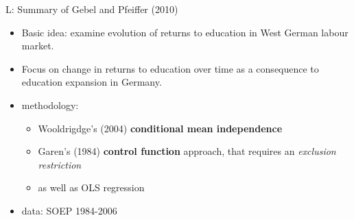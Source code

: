 \documentclass[10pt,ignorenonframetext,]{beamer}
\providecommand{\tightlist}{%
  \setlength{\itemsep}{0pt}\setlength{\parskip}{0pt}}
\begin{document}
\begin{frame}{L: Summary of Gebel and Pfeiffer (2010)}
\protect\hypertarget{l-summary-of-gebel-and-pfeiffer-2010}{}

\begin{itemize}
\item
  Basic idea: examine evolution of returns to education in West German
  labour market.
\item
  Focus on change in returns to education over time as a consequence to
  education expansion in Germany.
\item
  methodology:

  \begin{itemize}
  \tightlist
  \item
    Wooldrigdge's (2004) \textbf{conditional mean independence}
  \item
    Garen's (1984) \textbf{control function} approach, that requires an
    \emph{exclusion restriction}
  \item
    as well as OLS regression
  \end{itemize}
\item
  data: SOEP 1984-2006
\end{itemize}

\end{frame}
\end{document}
